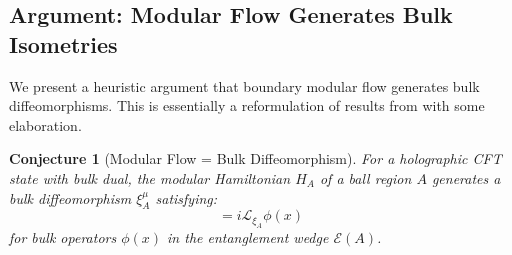 \documentclass[12pt,a4paper]{article}
\newtheorem{conjecture}[theorem]{Conjecture}
\begin{document}
\subsection{Argument: Modular Flow Generates Bulk Isometries}

We present a heuristic argument that boundary modular flow generates bulk diffeomorphisms. This is essentially a reformulation of results from \cite{faulkner2017} with some elaboration.

\begin{conjecture}[Modular Flow = Bulk Diffeomorphism]
For a holographic CFT state with bulk dual, the modular Hamiltonian $H_A$ of a ball region $A$ generates a bulk diffeomorphism $\xi_A^\mu$ satisfying:
\begin{equation}
[\phi(x), H_A] = i \mathcal{L}_{\xi_A} \phi(x)
\end{equation}
for bulk operators $\phi(x)$ in the entanglement wedge $\mathcal{E}(A)$.
\end{conjecture}
\end{document}
